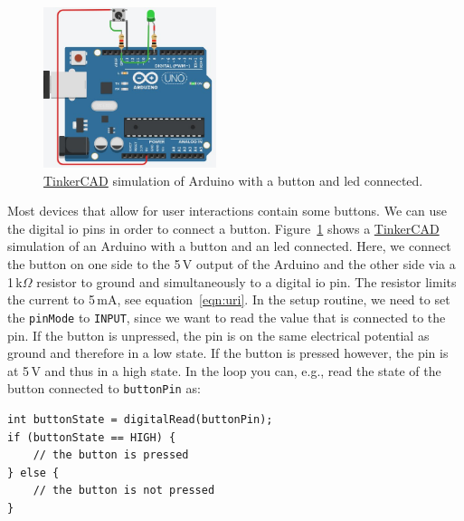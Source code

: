 \begin{figure}[tb]
    \centering
    \includegraphics[width=0.45\textwidth]{graphics/01_blink/arduino_button_led_tinkercad.jpg}
    \caption{\href{https://www.tinkercad.com}{TinkerCAD} simulation of Arduino with a button and \ac{led} connected.}
    \label{fig:intro:button_led}
\end{figure}
Most devices that allow for user interactions contain some buttons. We can use the digital \ac{io} pins in order to connect a button. Figure~\ref{fig:intro:button_led} shows a \href{https://www.tinkercad.com}{TinkerCAD} simulation of an Arduino with a button and an \ac{led} connected. Here, we connect the button on one side to the 5\,V output of the Arduino and the other side via a 1\,k$\Omega$ resistor to ground and simultaneously to a digital \ac{io} pin. The resistor limits the current to 5\,mA, see equation~\eqref{eqn:uri}. In the setup routine, we need to set the \lstinline{pinMode} to \lstinline{INPUT}, since we want to read the value that is connected to the pin. If the button is unpressed, the pin is on the same electrical potential as ground and therefore in a low state. If the button is pressed however, the pin is at 5\,V and thus in a high state. In the loop you can, e.g., read the state of the button connected to \lstinline{buttonPin} as:
\begin{lstlisting}
int buttonState = digitalRead(buttonPin);
if (buttonState == HIGH) {
    // the button is pressed
} else {
    // the button is not pressed
}
\end{lstlisting}


